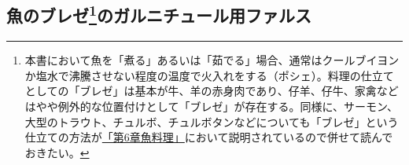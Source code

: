 \begin{main}

\hypertarget{farces-speciales-pour-garnir-les-poissons-braises}{%
\subsection[魚のブレゼのガルニチュール用ファルス]{\texorpdfstring{魚のブレゼ\footnote{本書において魚を「煮る」あるいは「茹でる」場合、通常はクールブイヨンか塩水で沸騰させない程度の温度で火入れをする（ポシェ）。料理の仕立てとしての「ブレゼ」は基本が牛、羊の赤身肉であり、仔羊、仔牛、家禽などはやや例外的な位置付けとして「ブレゼ」が存在する。同様に、サーモン、大型のトラウト、チュルボ、チュルボタンなどについても「ブレゼ」という仕立ての方法が\protect\hyperlink{cuisson-des-poissons-par-le-braisage}{「第6章魚料理」}において説明されているので併せて読んでおきたい。}のガルニチュール用ファルス}{魚のブレゼのガルニチュール用ファルス}}\label{farces-speciales-pour-garnir-les-poissons-braises}}


\end{main}

